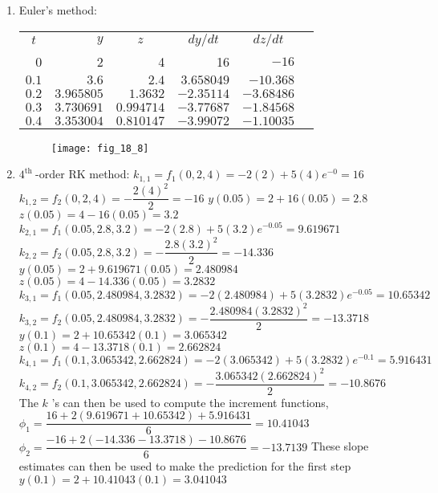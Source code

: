 \documentclass[../main.tex]{subfiles}
\begin{document}
\section{} \label{sec:sec_18_7}
\begin{enumerate}[label=\bfseries(\alph*)]
\item  Euler's method:
	\bigbreak
\begin{tabular}{rrrrrr}
\multicolumn{1}{c}{$t$} & $y$ & \multicolumn{1}{c}{$z$} & \multicolumn{1}{c}{$d y / d t$} & \multicolumn{1}{c}{$d z / d t$} \\
0 & 2 & 4 & 16 & $-16$ \\
$0.1$ & $3.6$ & $2.4$ & $3.658049$ & $-10.368$ \\
$0.2$ & $3.965805$ & $1.3632$ & $-2.35114$ & $-3.68486$ \\
$0.3$ & $3.730691$ & $0.994714$ & $-3.77687$ & $-1.84568$ \\
$0.4$ & $3.353004$ & $0.810147$ & $-3.99072$ & $-1.10035$ \\
\end{tabular}
	\bigbreak
	\begin{figure}[H]
		\texttt{[image: fig\_18\_8]}
		\label{fig:fig_18_8}
	\end{figure}
	\bigbreak
\item $4^{\text {th }}$-order RK method:
	\bigbreak
$k_{1,1}=f_{1}(0,2,4)=-2(2)+5(4) e^{-0}=16$
	\bigbreak
$k_{1,2}=f_{2}(0,2,4)=-\dfrac{2(4)^{2}}{2}=-16$
	\bigbreak
$y(0.05)=2+16(0.05)=2.8$
	\bigbreak
$z(0.05)=4-16(0.05)=3.2$
	\bigbreak
$k_{2,1}=f_{1}(0.05,2.8,3.2)=-2(2.8)+5(3.2) e^{-0.05}=9.619671 $\bigbreak
$k_{2,2}=f_{2}(0.05,2.8,3.2)=-\dfrac{2.8(3.2)^{2}}{2}=-14.336 $\bigbreak
$y(0.05)=2+9.619671(0.05)=2.480984 $\bigbreak
$z(0.05)=4-14.336(0.05)=3.2832 $\bigbreak
$k_{3,1}=f_{1}(0.05,2.480984,3.2832)=-2(2.480984)+5(3.2832) e^{-0.05}=10.65342 $\bigbreak
$k_{3,2}=f_{2}(0.05,2.480984,3.2832)=-\dfrac{2.480984(3.2832)^{2}}{2}=-13.3718 $\bigbreak
$y(0.1)=2+10.65342(0.1)=3.065342 $\bigbreak
$z(0.1)=4-13.3718(0.1)=2.662824 $\bigbreak
$k_{4,1}=f_{1}(0.1,3.065342,2.662824)=-2(3.065342)+5(3.2832) e^{-0.1}=5.916431 $\bigbreak
$k_{4,2}=f_{2}(0.1,3.065342,2.662824)=-\dfrac{3.065342(2.662824)^{2}}{2}=-10.8676$\bigbreak
	\bigbreak
The $k$ 's can then be used to compute the increment functions,
	\bigbreak
$\phi_{1}=\dfrac{16+2(9.619671+10.65342)+5.916431}{6}=10.41043$
	\bigbreak
$\phi_{2}=\dfrac{-16+2(-14.336-13.3718)-10.8676}{6}=-13.7139$
	\bigbreak
These slope estimates can then be used to make the prediction for the first step
	\bigbreak
$y(0.1)=2+10.41043(0.1)=3.041043$

\end{enumerate}
\end{document}
